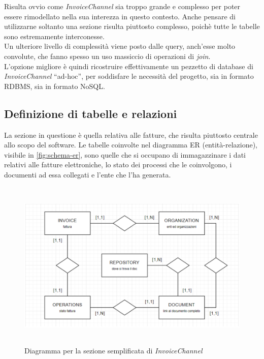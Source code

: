 \noindent Risulta ovvio come \textit{InvoiceChannel} sia troppo grande e complesso per poter essere rimodellato nella sua interezza in questo contesto. Anche pensare di utilizzarne soltanto una sezione risulta piuttosto complesso, poichè tutte le tabelle sono estremamente interconesse.\\
Un ulteriore livello di complessità viene posto dalle query, anch'esse molto convolute, che fanno spesso un uso massiccio di operazioni di \textit{join}.\\
L'opzione migliore è quindi ricostruire effettivamente un pezzetto di database di \textit{InvoiceChannel} ``ad-hoc'', per soddisfare le necessità del progetto, sia in formato RDBMS, sia in formato NoSQL.\\

\subsection{Definizione di tabelle e relazioni}
La sezione in questione è quella relativa alle fatture, che risulta piuttosto centrale allo scopo del software. Le tabelle coinvolte nel diagramma ER (entità-relazione), visibile in \autoref{fig:schema-er}, sono quelle che si occupano di immagazzinare i dati relativi alle fatture elettroniche, lo stato dei processi che le coinvolgono, i documenti ad essa collegati e l'ente che l'ha generata.\\

\begin{figure}[htbp]
\begin{center}
\includegraphics[height=22em]{immagini/ER-Mock-IC.png}
\caption{Diagramma per la sezione semplificata di \textit{InvoiceChannel}}
\label{fig:schema-er}
\end{center}
\end{figure}

